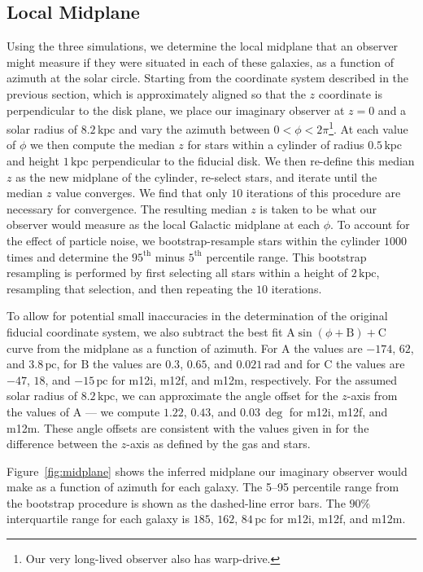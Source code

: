 \documentclass[twocolumn]{aastex62}
\newcommand{\pc}{\text{pc}}
\newcommand{\kpc}{\text{kpc}}
\begin{document}
\subsection{Local Midplane} \label{ssec:local_midplane}
Using the three simulations, we determine the local midplane that an
observer might measure if they were situated in each of these galaxies, as a function of azimuth at the solar circle. Starting from the coordinate system described in the previous section, which is approximately aligned so that the $z$ coordinate is perpendicular to the disk plane, we
place our imaginary observer at $z=0$ and a solar radius of $8.2\,\kpc$ and vary the azimuth between 
$0<\phi<2\pi$\footnote{Our very long-lived observer also has warp-drive.}. At each value of $\phi$ we then
compute the median $z$ for stars within a cylinder of radius $0.5\,\kpc$ and height $1\,\kpc$
perpendicular to the fiducial disk. We then re-define this median $z$ as the new midplane of the cylinder, re-select stars, and iterate until the median $z$ value converges. We find that only $10$ iterations of this procedure
are necessary for convergence. The resulting median $z$ is taken to be what our observer would measure as the local
Galactic midplane at each $\phi$.
To account for the effect of particle noise, we bootstrap-resample stars within the cylinder $1000$ times and determine
the $95^{\text{th}}$ minus $5^{\text{th}}$ percentile range. This bootstrap resampling is performed by first selecting all stars
within a height of $2\,\kpc$, resampling that selection, and then repeating
the $10$ iterations. 

To allow for potential small inaccuracies in the determination of the original fiducial coordinate system,
we also subtract the best fit $\text{A} \sin{\left(\phi + \text{B}\right)} +
\text{C}$ curve from the midplane as a function of azimuth. For $\text{A}$ the
values are $-174$, $62$, and $3.8\,\pc$, for $\text{B}$ the values are $0.3$,
$0.65$, and $0.021\,\text{rad}$ and for $\text{C}$ the values are $-47$, $18$,
and $-15\,\pc$ for m12i, m12f, and m12m, respectively. For the assumed solar
radius of $8.2\,\kpc$, we can approximate the angle offset for the $z$-axis
from the values of $\text{A}$ --- we compute $1.22$, $0.43$, and $0.03\,\deg$
for m12i, m12f, and m12m. These angle offsets are consistent with the values
given in \citet{2018arXiv180610564S} for the difference between the $z$-axis
as defined by the gas and stars.

Figure~\ref{fig:midplane} shows the inferred midplane our imaginary observer
would make as a function of azimuth for each galaxy. The 5--95 percentile range from the bootstrap procedure is shown as the dashed-line error bars. The $90\%$ interquartile
range for each galaxy is $185$, $162$, $84\,\pc$ for m12i, m12f, and m12m. 
\end{document}

